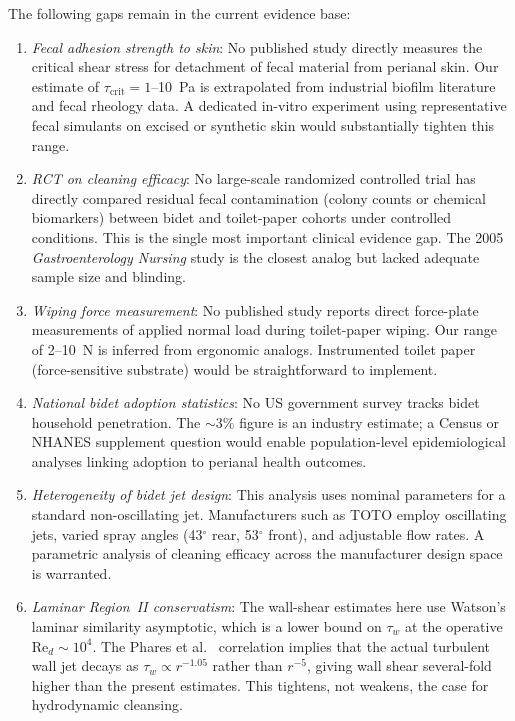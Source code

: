 \documentclass[aps,prfluids,reprint,amsmath,amssymb,floatfix]{revtex4-2}
\newcommand{\Rey}{\mathrm{Re}}
\begin{document}
The following gaps remain in the current evidence base:

\begin{enumerate}[leftmargin=*, label=(\roman*)]
    \item \emph{Fecal adhesion strength to skin}: No published study directly
    measures the critical shear stress for detachment of fecal material from
    perianal skin. Our estimate of $\tau_\mathrm{crit} = 1$--\SI{10}{Pa} is
    extrapolated from industrial biofilm literature and fecal rheology data.
    A dedicated in-vitro experiment using representative fecal simulants on
    excised or synthetic skin would substantially tighten this range.
    \item \emph{RCT on cleaning efficacy}: No large-scale randomized
    controlled trial has directly compared residual fecal contamination
    (colony counts or chemical biomarkers) between bidet and toilet-paper
    cohorts under controlled conditions. This is the single most important
    clinical evidence gap. The 2005 \textit{Gastroenterology Nursing} study
    is the closest analog but lacked adequate sample size and blinding.
    \item \emph{Wiping force measurement}: No published study reports direct
    force-plate measurements of applied normal load during toilet-paper wiping.
    Our range of 2--\SI{10}{N} is inferred from ergonomic analogs. Instrumented
    toilet paper (force-sensitive substrate) would be straightforward to
    implement.
    \item \emph{National bidet adoption statistics}: No US government survey
    tracks bidet household penetration. The $\sim3\%$ figure is an industry
    estimate; a Census or NHANES supplement question would enable population-level
    epidemiological analyses linking adoption to perianal health outcomes.
    \item \emph{Heterogeneity of bidet jet design}: This analysis uses
    nominal parameters for a standard non-oscillating jet. Manufacturers
    such as TOTO employ oscillating jets, varied spray angles (43$^\circ$ rear,
    53$^\circ$ front), and adjustable flow rates. A parametric analysis of
    cleaning efficacy across the manufacturer design space is warranted.
    \item \emph{Laminar Region~II conservatism}: The wall-shear
    estimates here use Watson's laminar similarity asymptotic, which
    is a lower bound on $\tau_w$ at the operative
    $\Rey_d \sim 10^4$. The Phares et al.~\citep{Phares2000}
    correlation implies that the actual turbulent wall jet decays as
    $\tau_w \propto r^{-1.05}$ rather than $r^{-5}$, giving wall
    shear several-fold higher than the present estimates. This
    tightens, not weakens, the case for hydrodynamic cleansing.
\end{enumerate}
\end{document}
